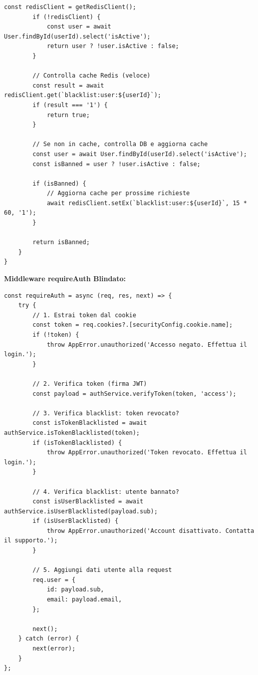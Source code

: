 \documentclass[11pt,a4paper]{article}
\begin{document}
\begin{lstlisting}[caption=Blacklist Redis per Token Revocati]
        const redisClient = getRedisClient();
        if (!redisClient) {
            const user = await User.findById(userId).select('isActive');
            return user ? !user.isActive : false;
        }

        // Controlla cache Redis (veloce)
        const result = await redisClient.get(`blacklist:user:${userId}`);
        if (result === '1') {
            return true;
        }

        // Se non in cache, controlla DB e aggiorna cache
        const user = await User.findById(userId).select('isActive');
        const isBanned = user ? !user.isActive : false;

        if (isBanned) {
            // Aggiorna cache per prossime richieste
            await redisClient.setEx(`blacklist:user:${userId}`, 15 * 60, '1');
        }

        return isBanned;
    }
}
\end{lstlisting}

\textbf{Middleware requireAuth Blindato:}

\begin{lstlisting}[caption=requireAuth con Blacklist Check]
const requireAuth = async (req, res, next) => {
    try {
        // 1. Estrai token dal cookie
        const token = req.cookies?.[securityConfig.cookie.name];
        if (!token) {
            throw AppError.unauthorized('Accesso negato. Effettua il login.');
        }

        // 2. Verifica token (firma JWT)
        const payload = authService.verifyToken(token, 'access');

        // 3. Verifica blacklist: token revocato?
        const isTokenBlacklisted = await authService.isTokenBlacklisted(token);
        if (isTokenBlacklisted) {
            throw AppError.unauthorized('Token revocato. Effettua il login.');
        }

        // 4. Verifica blacklist: utente bannato?
        const isUserBlacklisted = await authService.isUserBlacklisted(payload.sub);
        if (isUserBlacklisted) {
            throw AppError.unauthorized('Account disattivato. Contatta il supporto.');
        }

        // 5. Aggiungi dati utente alla request
        req.user = {
            id: payload.sub,
            email: payload.email,
        };

        next();
    } catch (error) {
        next(error);
    }
};
\end{lstlisting}
\end{document}
